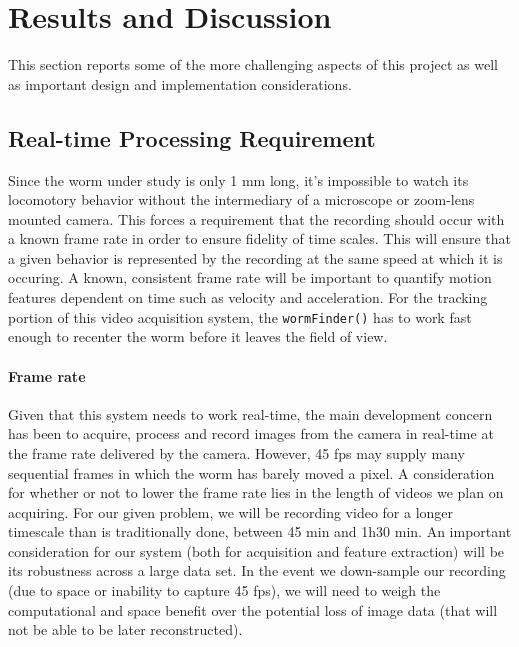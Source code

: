 \documentclass[main.tex]{subfiles}
\begin{document}
\section{Results and Discussion}
This section reports some of the more challenging aspects of this project as well as important design and implementation considerations. 

\subsection{Real-time Processing Requirement}
Since the worm under study is only 1 mm long, it's impossible to watch its locomotory behavior without the intermediary of a microscope or zoom-lens mounted camera. This forces a requirement that the recording should occur with a known frame rate in order to ensure fidelity of time scales. This will ensure that a given behavior is represented by the recording at the same speed at which it is occuring. A known, consistent frame rate will be important to quantify motion features dependent on time such as velocity and acceleration. For the tracking portion of this video acquisition system, the \verb|wormFinder()| has to work fast enough to recenter the worm before it leaves the field of view. 

\paragraph{Frame rate}
Given that this system needs to work real-time, the main development concern has been to acquire, process and record images from the camera in real-time at the frame rate delivered by the camera. However, 45 fps may supply many sequential frames in which the worm has barely moved a pixel. A consideration for whether or not to lower the frame rate lies in the length of videos we plan on acquiring. For our given problem, we will be recording video for a longer timescale than is traditionally done, between 45 min and 1h30 min. An important consideration for our system (both for acquisition and feature extraction) will be its robustness across a large data set. In the event we down-sample our recording (due to space or inability to capture 45 fps), we will need to weigh the computational and space benefit over the potential loss of image data (that will not be able to be later reconstructed).  
\end{document}
